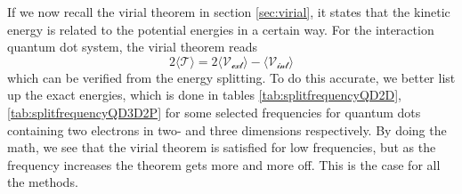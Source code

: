 If we now recall the virial theorem in section \ref{sec:virial}, it states that the kinetic energy is related to the potential energies in a certain way. For the interaction quantum dot system, the virial theorem reads
\begin{equation}
2\langle \mathcal{T} \rangle=2\langle \mathcal{V_{\text{ext}}} \rangle-\langle \mathcal{V_{\text{int}}} \rangle
\end{equation}
which can be verified from the energy splitting. To do this accurate, we better list up the exact energies, which is done in tables \eqref{tab:splitfrequencyQD2D},\eqref{tab:splitfrequencyQD3D2P} for some selected frequencies for quantum dots containing two electrons in two- and three dimensions respectively. By doing the math, we see that the virial theorem is satisfied for low frequencies, but as the frequency increases the theorem gets more and more off. This is the case for all the methods.

